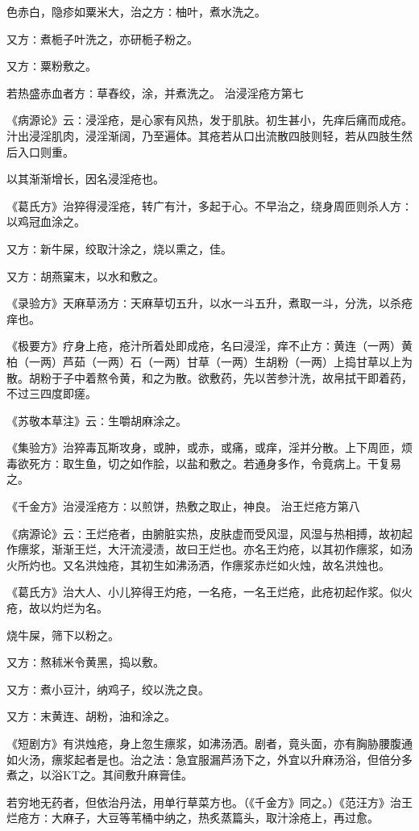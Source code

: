 \documentclass[a4paper,12pt,UTF8,twoside]{ctexbook}
\begin{document}
色赤白，隐疹如粟米大，治之方∶柚叶，煮水洗之。

又方∶煮栀子叶洗之，亦研栀子粉之。

又方∶粟粉敷之。

若热盛赤血者方∶草舂绞，涂，并煮洗之。
治浸淫疮方第七

《病源论》云∶浸淫疮，是心家有风热，发于肌肤。初生甚小，先痒后痛而成疮。汁出浸淫肌肉，浸淫渐阔，乃至遍体。其疮若从口出流散四肢则轻，若从四肢生然后入口则重。

以其渐渐增长，因名浸淫疮也。

《葛氏方》治猝得浸淫疮，转广有汁，多起于心。不早治之，绕身周匝则杀人方∶以鸡冠血涂之。

又方∶新牛屎，绞取汁涂之，烧以熏之，佳。

又方∶胡燕窠末，以水和敷之。

《录验方》天麻草汤方∶天麻草切五升，以水一斗五升，煮取一斗，分洗，以杀疮痒也。

《极要方》疗身上疮，疮汁所着处即成疮，名曰浸淫，痒不止方∶黄连（一两）黄柏（一两）芦茹（一两）石（一两）甘草（一两）生胡粉（一两）上捣甘草以上为散。胡粉于子中着熬令黄，和之为散。欲敷药，先以苦参汁洗，故帛拭干即着药，不过三四度即瘥。

《苏敬本草注》云∶生嚼胡麻涂之。

《集验方》治猝毒瓦斯攻身，或肿，或赤，或痛，或痒，淫并分散。上下周匝，烦毒欲死方∶取生鱼，切之如作脍，以盐和敷之。若通身多作，令竟病上。干复易之。

《千金方》治浸淫疮方∶以煎饼，热敷之取止，神良。
治王烂疮方第八

《病源论》云∶王烂疮者，由腑脏实热，皮肤虚而受风湿，风湿与热相搏，故初起作瘭浆，渐渐王烂，大汗流浸渍，故曰王烂也。亦名王灼疮，以其初作瘭浆，如汤火所灼也。又名洪烛疮，其初生如沸汤洒，作瘭浆赤烂如火烛，故名洪烛也。

《葛氏方》治大人、小儿猝得王灼疮，一名疮，一名王烂疮，此疮初起作浆。似火疮，故以灼烂为名。

烧牛屎，筛下以粉之。

又方∶熬秫米令黄黑，捣以敷。

又方∶煮小豆汁，纳鸡子，绞以洗之良。

又方∶末黄连、胡粉，油和涂之。

《短剧方》有洪烛疮，身上忽生瘭浆，如沸汤洒。剧者，竟头面，亦有胸胁腰腹通如火汤，瘭浆起者是也。治之法∶急宜服漏芦汤下之，外宜以升麻汤浴，但倍分多煮之，以浴KT之。其间敷升麻膏佳。

若穷地无药者，但依治丹法，用单行草菜方也。（《千金方》同之。）《范汪方》治王烂疮方∶大麻子，大豆等苇桶中纳之，热炙蒸篇头，取汁涂疮上，再过愈。
\end{document}
